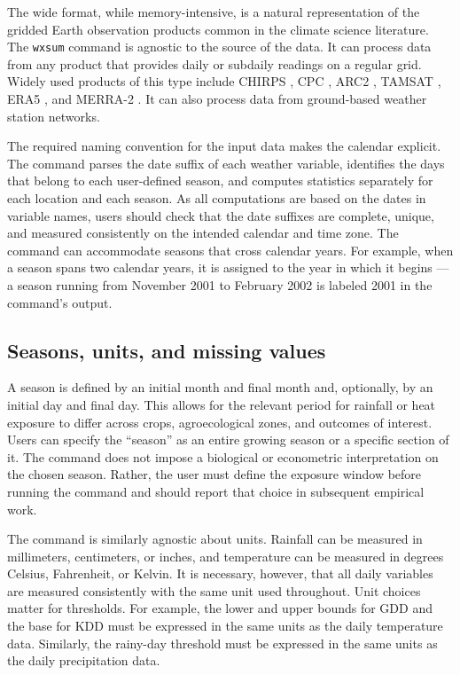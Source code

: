 The wide format, while memory-intensive, is a natural representation of the gridded Earth observation products common in the climate science literature. The \texttt{wxsum} command is agnostic to the source of the data. It can process data from any product that provides daily or subdaily readings on a regular grid. Widely used products of this type include CHIRPS \citep{CHIRPS}, CPC \citep{CPC08}, ARC2 \citep{ARC2}, TAMSAT \citep{TAMSAT}, ERA5 \citep{ERA5}, and MERRA-2 \citep{MERRA2}. It can also process data from ground-based weather station networks. 

The required naming convention for the input data makes the calendar explicit. The command parses the date suffix of each weather variable, identifies the days that belong to each user-defined season, and computes statistics separately for each location and each season. As all computations are based on the dates in variable names, users should check that the date suffixes are complete, unique, and measured consistently on the intended calendar and time zone. The command can accommodate seasons that cross calendar years. For example, when a season spans two calendar years, it is assigned to the year in which it begins — a season running from November 2001 to February 2002 is labeled 2001 in the command's output.

\subsection{Seasons, units, and missing values}

A season is defined by an initial month and final month and, optionally, by an initial day and final day. This allows for the relevant period for rainfall or heat exposure to differ across crops, agroecological zones, and outcomes of interest. Users can specify the ``season'' as an entire growing season or a specific section of it. The command does not impose a biological or econometric interpretation on the chosen season. Rather, the user must define the exposure window before running the command and should report that choice in subsequent empirical work.

The command is similarly agnostic about units. Rainfall can be measured in millimeters, centimeters, or inches, and temperature can be measured in degrees Celsius, Fahrenheit, or Kelvin. It is necessary, however, that all daily variables are measured consistently with the same unit used throughout. Unit choices matter for thresholds. For example, the lower and upper bounds for GDD and the base for KDD must be expressed in the same units as the daily temperature data. Similarly, the rainy-day threshold must be expressed in the same units as the daily precipitation data.

